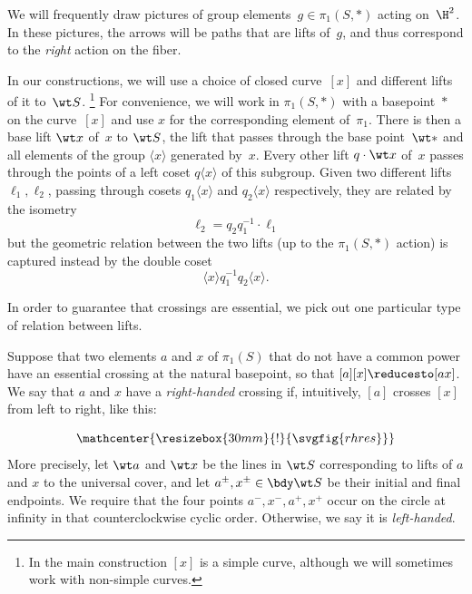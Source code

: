 We will frequently draw pictures of group elements~$g\in\pi_1(S,\ast)$
acting on~$\H^2$. In these pictures, the arrows will be paths that
are lifts of~$g$, and thus correspond to the \emph{right} action on the
fiber.

In our constructions, we will use a choice of closed curve~$[x]$ and
different lifts of it to~$\wt S$.%
\footnote{In the main construction $[x]$ is a simple curve, although
  we will sometimes work with non-simple curves.} %
For convenience, we will work in $\pi_1(S,\ast)$ with a
basepoint~$\ast$ on the curve~$[x]$ and use $x$ for the corresponding
element of~$\pi_1$. There is then a base lift $\wt x$ of~$x$ to
$\wt S$, the lift that passes through the base point~$\wt *$ and all
elements of the group $\langle x \rangle$ generated by~$x$. Every
other lift  $q \cdot \wt x$ of~$x$ passes through the points of a left
coset $q\langle x\rangle$ of this subgroup. Given two different lifts
$\ell_1,\ell_2$, passing through cosets $q_1 \langle x \rangle$ and
$q_2 \langle x \rangle$ respectively, they are related by the isometry
\begin{equation}
  \ell_2 = q_2 q_1^{-1} \cdot \ell_1
\end{equation}
but the geometric relation between the two lifts (up to the
$\pi_1(S,*)$ action)  is captured instead by the double coset
\begin{equation}\label{eq:double_coset}
  \langle x \rangle q_1^{-1} q_2 \langle x \rangle.
\end{equation}

In order to guarantee that crossings are essential, we pick out one
particular type of relation between lifts.

\begin{definition}
  Suppose that two elements $a$ and $x$ of $\pi_1(S)$ that do not have a common power have an
  essential crossing at the natural basepoint, so that
  $[a][x] \reducesto [ax]$. We say that $a$ and $x$ have a
  \emph{right-handed} crossing if, intuitively, $[a]$ crosses $[x]$ from left
  to right, like this:

  \[\mathcenter{\resizebox{30mm}{!}{\svgfig{rhres}}}
  \]
  More precisely, let $\wt a$ and $\wt x$ be the lines in $\wt S$
  corresponding to lifts of $a$ and $x$ to the universal cover, and
  let $a^{\pm},x^{\pm} \in \bdy \wt S$ be their initial and final
  endpoints. We require that the four points $a^-,x^-,a^+, x^+$
  occur on the circle at infinity in that counterclockwise cyclic order. Otherwise, we say it is \emph{left-handed}.
\end{definition}

